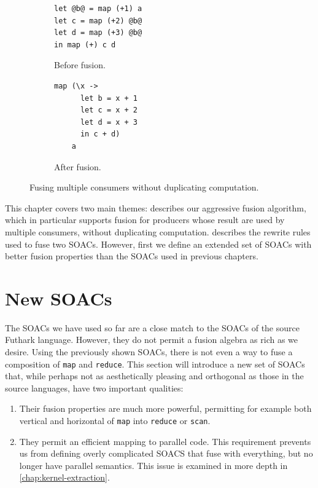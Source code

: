 \begin{figure}
\begin{subfigure}[b]{0.4\textwidth}
\begin{lstlisting}[xleftmargin=0pt]
let @b@ = map (+1) a
let c = map (+2) @b@
let d = map (+3) @b@
in map (+) c d
\end{lstlisting}
\caption{Before fusion.}
\end{subfigure}%
\hspace{.1\textwidth}
\begin{subfigure}[b]{0.4\textwidth}
\begin{lstlisting}[xleftmargin=0pt]
map (\x ->
      let b = x + 1
      let c = x + 2
      let d = x + 3
      in c + d)
    a
\end{lstlisting}
\caption{After fusion.}
\end{subfigure}%
\caption{Fusing multiple consumers without duplicating computation.}
\label{fig:fusion-multiple-consumers}
\end{figure}

This chapter covers two main themes: 
describes our aggressive fusion algorithm, which in particular
supports fusion for producers whose result are used by multiple
consumers, without duplicating computation.  
describes the rewrite rules used to fuse two SOACs.  However, first we
define an extended set of SOACs with better fusion properties than the
SOACs used in previous chapters.

\section{New SOACs}
\label{sec:fusion-in-futhark}

The SOACs we have used so far are a close match to the SOACs of the
source Futhark language.  However, they do not permit a fusion algebra
as rich as we desire.  Using the previously shown SOACs, there is not
even a way to fuse a composition of \lstinline{map} and
\lstinline{reduce}.  This section will introduce a new set of SOACs
that, while perhaps not as aesthetically pleasing and orthogonal as
those in the source languages, have two important qualities:

\begin{enumerate}
\item Their fusion properties are much more powerful, permitting for
  example both vertical and horizontal of \lstinline{map} into
  \lstinline{reduce} or \lstinline{scan}.
\item They permit an efficient mapping to parallel code.  This
  requirement prevents us from defining overly complicated SOACS that
  fuse with everything, but no longer have parallel semantics.  This
  issue is examined in more depth in \cref{chap:kernel-extraction}.
\end{enumerate}

